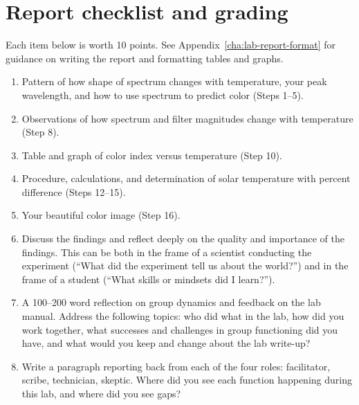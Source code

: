 \section{Report checklist and grading}

Each item below is worth 10 points. See Appendix\ \ref{cha:lab-report-format} for guidance on writing the report and formatting tables and graphs.

\begin{enumerate}
	
	\item Pattern of how shape of spectrum changes with temperature, your peak wavelength, and how to use spectrum to predict color (Steps 1--5).
	
	\item Observations of how spectrum and filter magnitudes change with temperature (Step 8).
	
	\item Table and graph of color index versus temperature (Step 10).
	
	\item Procedure, calculations, and determination of solar temperature with percent difference (Steps 12--15).
	
	\item Your beautiful color image (Step 16).
	
	\item Discuss the findings and reflect deeply on the quality and importance of the findings. This can
	be both in the frame of a scientist conducting the experiment (“What did the experiment tell us
	about the world?”) and in the frame of a student (“What skills or mindsets did I learn?”).
	
	\item A 100–200 word reflection on group dynamics and feedback on the lab manual. Address the
	following topics: who did what in the lab, how did you work together, what successes and
	challenges in group functioning did you have, and what would you keep and change about the
	lab write-up?
	
	\item Write a paragraph reporting back from each of the four roles: facilitator, scribe, technician,
	skeptic. Where did you see each function happening during this lab, and where did you see
	gaps?
\end{enumerate}
